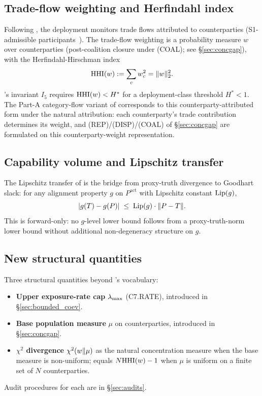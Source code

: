\subsection{Trade-flow weighting and Herfindahl index}

Following \citep[Need Sufficiency]{lasser2026paper8b}, the
deployment monitors trade flows attributed to counterparties
(S1-admissible participants~\citep{lasser2026paper8a}). The
trade-flow weighting is a probability measure $w$ over
counterparties (post-coalition closure under (COAL); see
\S\ref{sec:concgap}), with the Herfindahl-Hirschman
index~\citep{herfindahl1950concentration,hirschman1964paternity}
\begin{equation}
  \mathrm{HHI}(w) := \sum_c w_c^2 = \|w\|_2^2.
\end{equation}
\citep[Deployment Safety]{lasser2026paper10}'s invariant $I_5$
requires $\mathrm{HHI}(w) < H^*$ for a deployment-class threshold $H^* <
1$. The Part-A category-flow variant of
\citep{lasser2026paper8b} corresponds to this counterparty-attributed
form under the natural attribution: each counterparty's
trade contribution determines its weight, and (REP)/(DISP)/(COAL)
of \S\ref{sec:concgap} are formulated on this counterparty-weight
representation.

\subsection{Capability volume and Lipschitz transfer}

The Lipschitz transfer of \citep[Theorem~2]{lasser2026micro} is
the bridge from proxy-truth divergence to Goodhart slack: for
any alignment property $g$ on $P^{\mathrm{act}}$ with Lipschitz
constant $\mathrm{Lip}(g)$,
\begin{equation}
\label{eq:lip-transfer-shared}
  |g(T) - g(P)| \;\leq\; \mathrm{Lip}(g) \cdot
  \|P - T\|.
\end{equation}
This is forward-only: no $g$-level lower bound follows from a
proxy-truth-norm lower bound without additional non-degeneracy
structure on $g$.

\subsection{New structural quantities}

Three structural quantities beyond
\citep[Deployment Safety]{lasser2026paper10}'s vocabulary:
\begin{itemize}
\item \textbf{Upper exposure-rate cap} $\lambda_{\max}$ (C7.RATE),
  introduced in \S\ref{sec:bounded_coev}.
\item \textbf{Base population measure} $\mu$ on counterparties,
  introduced in \S\ref{sec:concgap}.
\item \textbf{$\chi^2$ divergence} $\chi^2(w \| \mu)$ as the
  natural concentration measure when the base measure is
  non-uniform; equals $N \mathrm{HHI}(w) - 1$ when $\mu$ is uniform on a
  finite set of $N$ counterparties.
\end{itemize}

Audit procedures for each are in \S\ref{sec:audits}.
